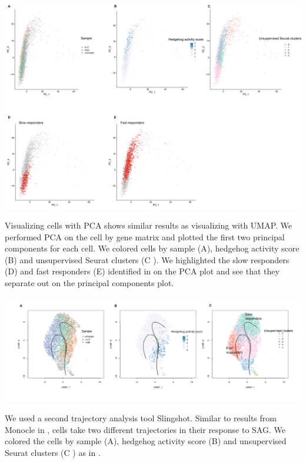 \begin{suppfigure}[p]  
    \centering
    \includegraphics[width=\linewidth]{figures/hedgehog/SuppFigure5.png}
    \caption[PCA visualizations are similar to UMAP]{
        Visualizing cells with PCA shows similar results as visualizing with UMAP. We performed PCA on the cell by gene matrix and plotted the first two principal components for each cell. We colored cells by sample (A), hedgehog activity score (B) and unsupervised Seurat clusters (C ). We highlighted the slow responders (D) and fast responders (E)  identified in  on the PCA plot and see that they separate out on the principal components plot.
    }
    \label{fig:hh_figureS5}
\end{suppfigure}

\begin{suppfigure}[p]  
    \centering
    \includegraphics[width=\linewidth]{figures/hedgehog/SuppFigure6.png}
    \caption[Slingshot trajectory analysis results]{
        We used a second trajectory analysis tool Slingshot. Similar to results from Monocle in , cells take two different trajectories in their response to SAG. We colored the cells by sample (A), hedgehog activity score (B) and unsupervised Seurat clusters (C ) as in . 
    }
    \label{fig:hh_figureS6}
\end{suppfigure}

